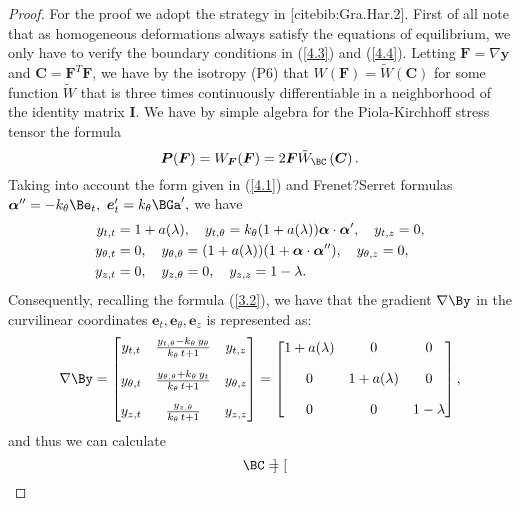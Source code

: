 \begin{proof}
For the proof we adopt the strategy in [cite{bib:Gra.Har.2}]. First of all note that as homogeneous deformations always satisfy the equations of equilibrium, we only have to verify the boundary conditions in (\ref{4.3}) and (\ref{4.4}). Letting $\bm F=\nabla\bm y$ and $\bm C= \bm F^T\bm F$, we have by the isotropy (P6) that $W(\bm F)=\tilde W\left(\bm C\right)$ for some function $\tilde W$ that is three times continuously differentiable in a neighborhood of the identity matrix $\boldsymbol{I}$. We have by simple algebra for the Piola-Kirchhoff stress tensor the formula
\begin{equation}
\label{4.5}
\boldsymbol{P}(\boldsymbol{F})=W_{\boldsymbol{F}}(\boldsymbol{F})=2 \boldsymbol{F} \tilde{W}_{\BC}\left(\boldsymbol{C}\right).
\end{equation}
Taking into account the form given in (\ref{4.1}) and Frenet?Serret formulas $\bm\alpha''=-k_\theta \Be_t,$ $\bm e'_t=k_\theta\BGa',$ we have 
\begin{align*}
    y_{t,t}&=1+a(\lambda),\quad y_{t,\theta}=k_\theta(1+a(\lambda))\bm\alpha\cdot \bm \alpha', \quad y_{t,z}=0,\\
    y_{\theta,t}&=0,\quad y_{\theta,\theta}=(1+a(\lambda))(1+\bm\alpha\cdot \bm\alpha''),\quad y_{\theta,z}=0,\\
    y_{z,t}&=0,\quad y_{z,\theta}=0,\quad y_{z,z}=1-\lambda.
\end{align*}
Consequently, recalling the formula (\ref{3.2}), we have that the gradient $\nabla \By$ in the curvilinear coordinates $\bm{e}_t,\bm{e}_\theta,\bm{e}_z$ is represented as:
\begin{equation}
\label{4.6}
\nabla \By=\begin{bmatrix} y_{t,t} & \frac{y_{t,\theta}-k_{\theta }\,y_\theta}{k_{\theta }\,t+1} & y_{t,z} \\[10pt]
y_{\theta,t} & \frac{y_{\theta,\theta}+k_{\theta }\,y_t}{k_{\theta }\,t+1} & y_{\theta,z}\\[10pt]
y_{z,t} & \frac{y_{z,\theta}}{k_{\theta }\,t+1} & y_{z,z} \end{bmatrix}=
 \begin{bmatrix}
1+a(\Gl) & 0 &0 \\[10pt]
 0 & 1+a(\Gl) & 0 \\[10pt]
  0 & 0 & 1-\Gl
\end{bmatrix},
\end{equation}
and thus we can calculate
\begin{equation}
\label{4.7}
\BC=\begin{bmatrix}

\end{bmatrix}
\end{equation}
\end{proof}
